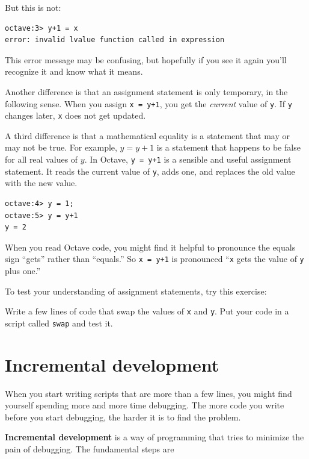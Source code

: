 \documentclass{book}
\begin{document}
But this is not:

\begin{verbatim}
octave:3> y+1 = x
error: invalid lvalue function called in expression
\end{verbatim}

This error message may be confusing, but hopefully if you see it again you'll
recognize it and know what it means.

Another difference is that an assignment statement is only temporary,
in the following sense. When you assign {\tt x = y+1}, you get the
{\em current} value of {\tt y}. If {\tt y} changes later, {\tt x}
does not get updated.

A third difference is that a mathematical equality is a statement that
may or may not be true. For example, $y = y+1$ is a statement that
happens to be false for all real values of $y$. In Octave, {\tt y
= y+1} is a sensible and useful assignment statement. It reads the
current value of {\tt y}, adds one, and replaces the old value with
the new value.

\begin{verbatim}
octave:4> y = 1;
octave:5> y = y+1
y = 2
\end{verbatim}

When you read Octave code, you might find it helpful to pronounce
the equals sign ``gets'' rather than ``equals.'' So {\tt x = y+1}
is pronounced ``{\tt x} gets the value of {\tt y} plus one.''

To test your understanding of assignment statements, try this
exercise:

\begin{ex}
Write a few lines of code that swap the values of
{\tt x} and {\tt y}. Put your code in a script called {\tt swap}
and test it.
\end{ex}

\section{Incremental development}

When you start writing scripts that are more than a few lines, you
might find yourself spending more and more time debugging. The more
code you write before you start debugging, the harder it is to find
the problem.

{\bf Incremental development} is a way of programming that tries
to minimize the pain of debugging. The fundamental steps are
\end{document}
